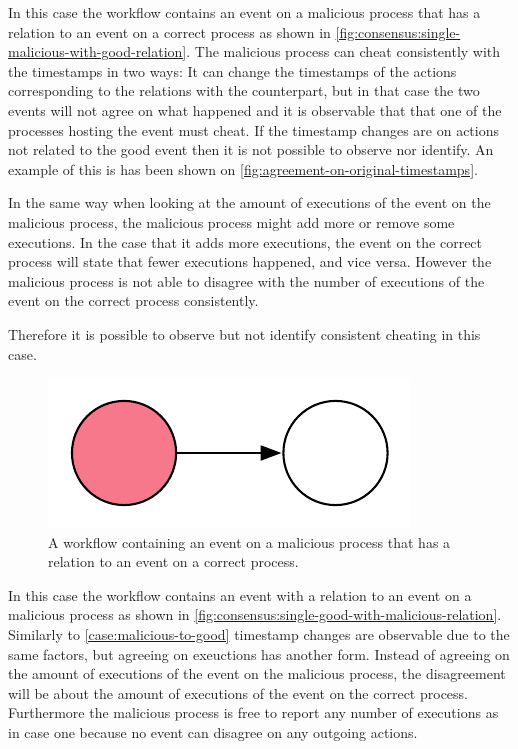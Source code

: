 	\begin{case}
		In this case the workflow contains an event on a malicious process that has a relation to an event on a correct process as shown in \autoref{fig:consensus:single-malicious-with-good-relation}. The malicious process can cheat consistently with the timestamps in two ways: It can change the timestamps of the actions corresponding to the relations with the counterpart, but in that case the two events will not agree on what happened and it is observable that that one of the processes hosting the event must cheat. If the timestamp changes are on actions not related to the good event then it is not possible to observe nor identify. An example of this is has been shown on \autoref{fig:agreement-on-original-timestamps}.
		
		In the same way when looking at the amount of executions of the event on the malicious process, the malicious process might add more or remove some executions. In the case that it adds more executions, the event on the correct process will state that fewer executions happened, and vice versa. However the malicious process is not able to disagree with the number of executions of the event on the correct process consistently. 
		
		Therefore it is possible to observe but not identify consistent cheating in this case. 
		\label{case:malicious-to-good}
	\end{case}

	\begin{figure}[H]
		\centering
		\includegraphics{6validation/images/3.pdf}
		\caption{A workflow containing an event on a malicious process that has a relation to an event on a correct process.}
		\label{fig:consensus:single-malicious-with-good-relation}
	\end{figure}
	
	\begin{case}
		In this case the workflow contains an event with a relation to an event on a malicious process as shown in \autoref{fig:consensus:single-good-with-malicious-relation}. Similarly to \autoref{case:malicious-to-good} timestamp changes are observable due to the same factors, but agreeing on exeuctions has another form. Instead of agreeing on the amount of executions of the event on the malicious process, the disagreement will be about the amount of executions of the event on the correct process. Furthermore the malicious process is free to report any number of executions as in case one because no event can disagree on any outgoing actions. 
		\label{case:good-to-malicious}
	\end{case}
	 
